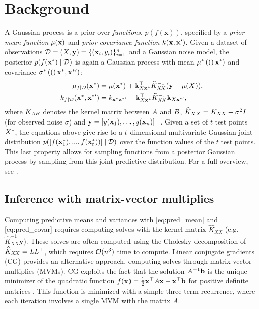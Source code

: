 \section{Background}
A Gaussian process is a prior over \emph{functions}, $p(f(\mathbf{x}))$, specified by a \emph{prior mean function} $\mu(\mathbf{x})$ and \emph{prior covariance function} $k(\mathbf{x}, \mathbf{x}')$. Given a dataset of observations $\mathcal D = (X, \mathbf{y}) = \{(\mathbf{x}_i, y_i)\}_{i=1}^{n}$ and a Gaussian noise model, the posterior $p(f(\mathbf{x}^*) \mid \mathcal D)$ is again a Gaussian process with mean $\mu^* \left( ( \right)\mathbf{x}^*)$ and covariance $\sigma^* \left( ( \right)\mathbf{x}^*,\mathbf{x}^{*\prime})$:
\begin{align}
  \mu_{f \mid \mathcal D}(\mathbf{x}^*) &= \mu(\mathbf{x}^*) + \mathbf{k}_{X \mathbf{x}^*}^\top  \widehat K_{X\!X}^{-1} (\mathbf{y} - \mu(X)) \label{eq:pred_mean}, \\
  k_{f\mid\mathcal D}(\mathbf{x}^*, \mathbf{x}^{*\prime}) &= k_{\mathbf{x}^{*} \mathbf{x}^{*\prime}} - \mathbf{k}_{X \mathbf{x}^{*}}^\top \widehat K_{X\!X}^{-1} \mathbf{k}_{X \mathbf{x}^{*\prime}},
    \label{eq:pred_covar}
\end{align}
where $K_{AB}$ denotes the kernel matrix between $A$ and $B$, $\widehat{K}_{XX} = K_{XX} + \sigma^2 I$ (for observed noise $\sigma$) and $\mathbf{y} = [y(\mathbf{x}_1),\dots,y(\mathbf{x}_n)]^{\top}$.
Given a set of $t$ test points $X^{*}$, the equations above give rise to a $t$ dimensional multivariate Gaussian joint distribution
$p([f(\mathbf{x}^{*}_{1}),...,f(\mathbf{x}^{*}_{t}))] \mid \mathcal D)$ over the function values of the $t$ test points. This last property allows for sampling functions from a posterior Gaussian process by sampling from this joint predictive distribution. For a full overview, see \cite{rasmussen2006gaussian}.

\subsection{Inference with matrix-vector multiplies}
Computing predictive means and variances with \eqref{eq:pred_mean} and \eqref{eq:pred_covar} requires computing solves with the kernel matrix $\widehat K_{X \! X}$ (e.g. $\widehat K_{X \! X}^{-1} \mathbf y$).
These solves are often computed using the Cholesky decomposition of $\widehat K_{X \! X} = L L^\top$, which requires $\bigo{n^3}$ time to compute.
{Linear conjugate gradients} (CG) provides an alternative approach, computing solves through matrix-vector multiplies (MVMs).
CG exploits the fact that the solution $A^{-1}\mathbf{b}$ is the unique minimizer of the quadratic function $f(\mathbf{x}) =\frac{1}{2}\mathbf{x}^{\top}A\mathbf{x} - \mathbf{x}^{\top} \mathbf{b}$ for positive definite matrices \cite{golub2012matrix}.
This function is minimized with a simple three-term recurrence, where each iteration involves a single MVM with the matrix $A$.

